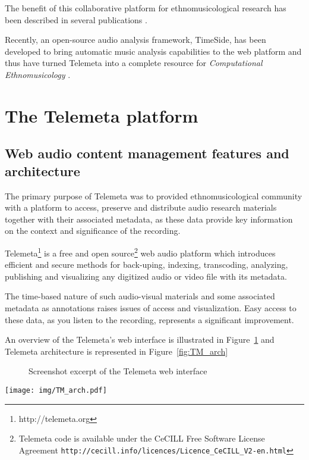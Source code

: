 \documentclass{paper}
\begin{document}
The benefit of this collaborative platform for ethnomusicological research has been described in several publications \citep{Simmonot_IASA_2011, Julien_IASA_2011, Simonnot_ICTM_2014}.

Recently, an open-source audio analysis framework, TimeSide, has been developed to bring automatic music analysis capabilities to the web platform and thus have turned Telemeta into a complete resource for \emph{Computational Ethnomusicology} \citep{Tzanetakis_2007_JIMS, Gomez_JNMR_2013}.

 \section{The Telemeta platform}\label{sec:Telemeta}
 \subsection{Web audio content management features and architecture}
The primary purpose of Telemeta was to provided ethnomusicological community with a platform to access, preserve and distribute audio research materials together with their associated metadata, as these data provide key information on the context and significance of the recording.

 Telemeta\footnote{http://telemeta.org} is a free and open source\footnote{Telemeta code is available under the CeCILL Free Software License Agreement \texttt{http://cecill.info/licences/Licence\_CeCILL\_V2-en.html}} web audio platform which introduces efficient and secure methods for back-uping, indexing, transcoding, analyzing, publishing and visualizing any digitized audio or video file with its metadata.

The time-based nature of such audio-visual materials and some associated metadata as annotations raises issues of access and visualization. Easy access to these data, as you listen to the recording, represents a significant improvement.

 An overview of the Telemeta's web interface is illustrated in Figure~\ref{fig:Telemeta} and Telemeta architecture is represented in Figure~\ref{fig:TM_arch}
 \begin{figure}
   \centering
   \caption[1]{Screenshot excerpt of the Telemeta web interface}
    \label{fig:Telemeta}
 \end{figure}

\begin{figure*}[htbp]
  \centering
  \texttt{[image: img/TM\_arch.pdf]}
  \caption{Telemeta architecture}\label{fig:TM_arch}
\end{figure*}
\end{document}
